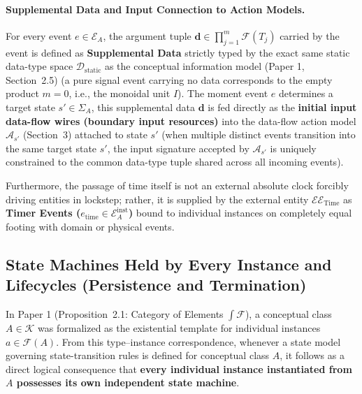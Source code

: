 \documentclass[11pt,a4paper]{article}
\theoremstyle{definition}
\theoremstyle{plain}
\theoremstyle{remark}
\newcommand{\Dstatic}{\mathcal{D}_{\mathrm{static}}}
\begin{document}
\paragraph{Supplemental Data and Input Connection to Action Models.}
For every event $e \in \mathcal{E}_A$, the argument tuple $\mathbf{d} \in \prod_{j=1}^m \mathcal{F}(T_j)$ carried by the event is defined as \textbf{Supplemental Data} strictly typed by the exact same static data-type space $\Dstatic$ as the conceptual information model (Paper 1, Section~2.5) (a pure signal event carrying no data corresponds to the empty product $m=0$, i.e., the monoidal unit $I$). The moment event $e$ determines a target state $s' \in \Sigma_A$, this supplemental data $\mathbf{d}$ is fed directly as the \textbf{initial input data-flow wires (boundary input resources)} into the data-flow action model $\mathcal{A}_{s'}$ (Section~3) attached to state $s'$ (when multiple distinct events transition into the same target state $s'$, the input signature accepted by $\mathcal{A}_{s'}$ is uniquely constrained to the common data-type tuple shared across all incoming events).

Furthermore, the passage of time itself is not an external absolute clock forcibly driving entities in lockstep; rather, it is supplied by the external entity $\mathcal{EE}_{\mathrm{Time}}$ as \textbf{Timer Events ($e_{\mathrm{time}} \in \mathcal{E}_A^{\mathrm{inst}}$)} bound to individual instances on completely equal footing with domain or physical events.

\subsection{State Machines Held by Every Instance and Lifecycles (Persistence and Termination)}
In Paper 1 (Proposition~2.1: Category of Elements $\int \mathcal{F}$), a conceptual class $A \in \mathcal{K}$ was formalized as the existential template for individual instances $a \in \mathcal{F}(A)$. From this type--instance correspondence, whenever a state model governing state-transition rules is defined for conceptual class $A$, it follows as a direct logical consequence that \textbf{every individual instance instantiated from $A$ possesses its own independent state machine}.
\end{document}
